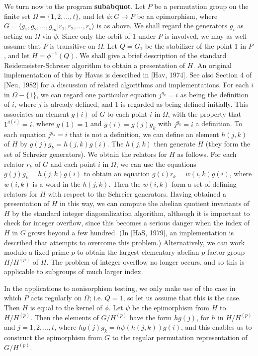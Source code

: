 We turn now to the program {\bf subabquot}.  Let $P$ be a permutation group on
the finite set $\Omega = \{1,2, \ldots , t\}$,  and let
$\phi: G \longrightarrow P$ be an
epimorphism, where
$G = \langle g_1, g_2, \ldots , g_m | r_1, r_2, \ldots , r_s \rangle$
is as above.  We shall regard the generators $g_i$ as acting on $\Omega$
via $\phi$. Since only the orbit of  1  under $P$ is involved, we may as well
assume that $P$ is transitive on $\Omega$. Let $Q = G_1$ be the stabilizer of
the point  1  in $P$,  and let $H = \phi^{-1}(Q)$.  We shall give a brief
description of the standard Reidemeister-Schreier algorithm to obtain a
presentation of $H$. An original implementation of this by Havas is described
in [Hav, 1974]. See also Section 4 of [Neu, 1982] for a discussion of
related algorithms and implementations.
For each $i$ in $\Omega - \{1\}$,  we can
regard one particular equation $j^{g_k} = i$ as being the definition of  $i$,
where $j$ is already defined,  and  1  is regarded as being defined initially.
This associates an element $g(i)$ of $G$  to each point
$i$ in $\Omega$, with the property that $1^{g(i)}=i$, where $g(1)=1$ and
$g(i)=g(j)g_k$ with $j^{g_k}=i$ a definition.
To each equation  $j^{g_k} = i$ that is not a definition,
we can define an element $h(j,k)$ of $H$ by $g(j)g_k = h(j,k)g(i)$. The $h(j,k)$
then generate $H$ (they form the set of Schreier generators).
We obtain the relators for $H$  as follows. For each relator $r_k$ of $G$ and
each point $i$ in $\Omega$, we can use the equations $g(j)g_k = h(j,k)g(i)$
to obtain an equation $g(i)r_k = w(i,k)g(i)$,  where $w(i,k)$ is a word in
the $h(j,k)$.  Then the $w(i,k)$ form a set of defining relators for $H$
with respect to the Schreier generators. Having obtained a presentation of
$H$ in this way, we can compute the abelian quotient invariants of $H$ by
the standard integer diagonalization algorithm, although it is important to
check for integer overflow, since this becomes a serious danger when the
index of $H$ in $G$ grows beyond a few hundred. (In [HaS, 1979], an
implementation is described that attempts to overcome this problem.)
Alternatively, we can work
modulo a fixed prime $p$ to obtain the largest elementary abelian $p$-factor
group $H/H^{(p)}$ of $H$. The problem of integer overflow no longer occurs,
and so this is applicable to subgroups of much larger index.

In the applications to nonisorphism testing, we only make use of the case in
which $P$  acts regularly on $\Omega$; i.e. $Q = 1$, so let us assume that this
is the case. Then $H$ is equal to the kernel of $\phi$.  Let  $\psi $ be the
epimorphism from  $H $ to  $H/H^{(p)}$.  Then the elements of $G/H^{(p)}$ have
the form  $\overline {h}g(j)$,  for $\overline{h}$ in $H/H^{(p)}$ and
$j = 1,2, \ldots ,t$, where
$\overline{h}g(j)g_k = \overline{h} \psi(h(j,k))g(i)$,
and this enables us to construct the
epimorphism from $G$ to the regular permutation representation of $G/H^{(p)}$.

